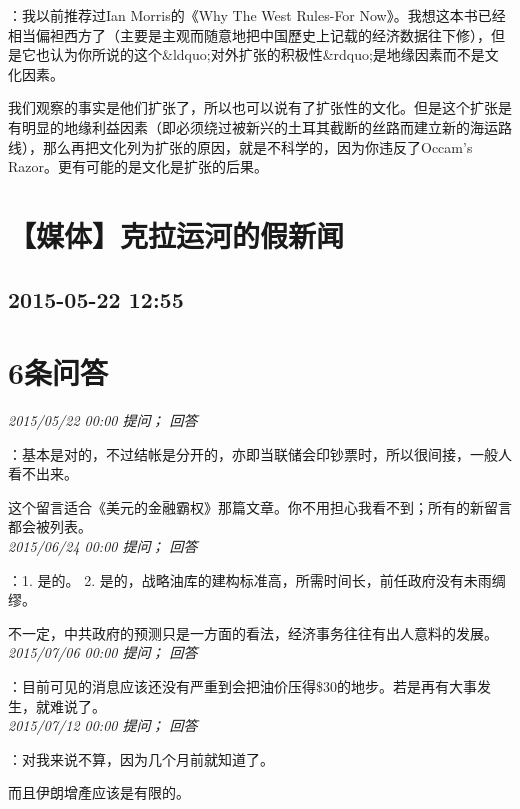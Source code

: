 \documentclass[twocolumn]{ctexart}
\begin{document}
：我以前推荐过Ian Morris的《Why The West Rules-For Now》。我想这本书已经相当偏袒西方了（主要是主观而随意地把中国歷史上记载的经济数据往下修），但是它也认为你所说的这个\&ldquo;对外扩张的积极性\&rdquo;是地缘因素而不是文化因素。

我们观察的事实是他们扩张了，所以也可以说有了扩张性的文化。但是这个扩张是有明显的地缘利益因素（即必须绕过被新兴的土耳其截断的丝路而建立新的海运路线），那么再把文化列为扩张的原因，就是不科学的，因为你违反了Occam's Razor。更有可能的是文化是扩张的后果。\\


\section{【媒体】克拉运河的假新闻}
\subsection{2015-05-22 12:55}


\section{6条问答}

\textit{\hfill\noindent\small 2015/05/22 00:00 提问； 回答}

：基本是对的，不过结帐是分开的，亦即当联储会印钞票时，所以很间接，一般人看不出来。

这个留言适合《美元的金融霸权》那篇文章。你不用担心我看不到；所有的新留言都会被列表。\\

\textit{\hfill\noindent\small 2015/06/24 00:00 提问； 回答}

：1. 是的。
2. 是的，战略油库的建构标准高，所需时间长，前任政府没有未雨绸缪。

不一定，中共政府的预测只是一方面的看法，经济事务往往有出人意料的发展。\\

\textit{\hfill\noindent\small 2015/07/06 00:00 提问； 回答}

：目前可见的消息应该还没有严重到会把油价压得\$30的地步。若是再有大事发生，就难说了。\\

\textit{\hfill\noindent\small 2015/07/12 00:00 提问； 回答}

：对我来说不算，因为几个月前就知道了。

而且伊朗增產应该是有限的。\\
\end{document}
